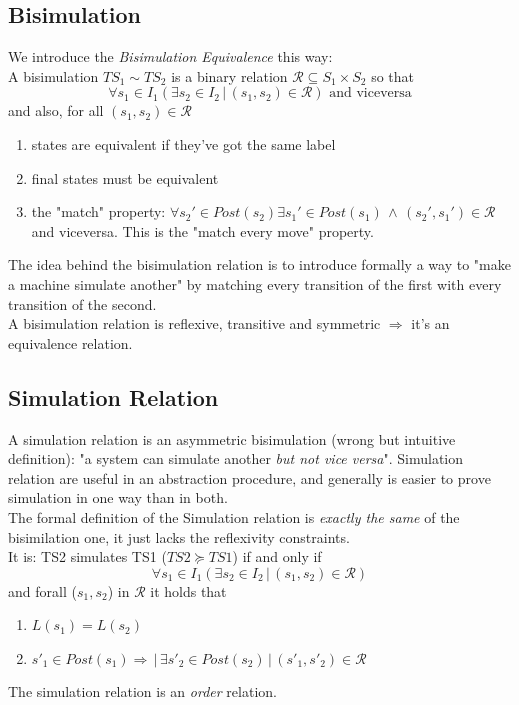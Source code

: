 \documentclass{article}
\begin{document}
			\subsection{Bisimulation}
				We introduce the \emph{Bisimulation Equivalence} this way:\\
				A bisimulation $TS_1 \sim TS_2$ is a binary relation $\mathcal{R} \subseteq S_1 \times S_2$ so that
				\begin{equation}
					\forall s_1 \in I_1 (\exists s_2 \in I_2 \,\vert\, (s_1, s_2) \in \mathcal{R}) \text{ and viceversa}
				\end{equation}
				and also, for all $(s_1, s_2) \in \mathcal{R}$
			 	\begin{enumerate}
			 		\item states are equivalent if they've got the same label
			 		\item final states must be equivalent
			 		\item the "match" property: $\forall s_2' \in Post(s_2) \exists s_1' \in Post(s_1) \,\wedge\, (s_2', s_1') \in \mathcal{R}$ and viceversa. This is the "match every move" property.
			 	\end{enumerate}
			 	The idea behind the bisimulation relation is to introduce formally a way to "make a machine simulate another" by matching every transition of the first with every transition of the second.\\
			 	A bisimulation relation is reflexive, transitive and symmetric $\Rightarrow$ it's an equivalence relation.
			 	
		 	\subsection{Simulation Relation}
		 		A simulation relation is an asymmetric bisimulation (wrong but intuitive definition): "a system can simulate another \emph{but not vice versa}". Simulation relation are useful in an abstraction procedure, and generally is easier to prove simulation in one way than in both.\\
		 		The formal definition of the Simulation relation is \emph{exactly the same} of the bisimilation one, it just lacks the reflexivity constraints.\\
		 		It is: TS2 simulates TS1 ($TS2 \succeq TS1$) if and only if
		 		\begin{equation}
					\forall s_1 \in I_1 (\exists s_2 \in I_2 \,\vert\, (s_1, s_2) \in \mathcal{R})
				\end{equation}
				and forall ($s_1, s_2$) in $\mathcal{R}$ it holds that
				\begin{enumerate}
					\item $L(s_1) = L(s_2)$
					\item $s'_1 \in Post(s_1) \Rightarrow \,\vert\, \exists s'_2 \in Post(s_2) \,\vert\, (s'_1, s'_2) \in \mathcal{R}$
				\end{enumerate}
		 		The simulation relation is an \emph{order} relation.
		 		
\end{document}
